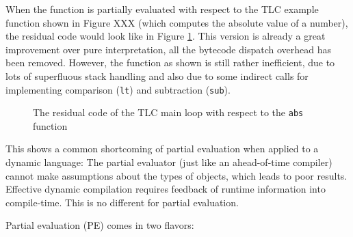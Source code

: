 When the function is partially evaluated with respect to the TLC example
function shown in Figure XXX (which computes the absolute value of a number),
the residual code would look like in Figure \ref{fig:tlc-folded}. This version
is already a great improvement over pure interpretation, all the bytecode
dispatch overhead has been removed. However, the function as shown is still
rather inefficient, due to lots of superfluous stack handling and also due to
some indirect calls for implementing comparison (\lstinline{lt}) and
subtraction (\lstinline{sub}).

\begin{figure}[h]
\label{fig:tlc-folded}
\begin{center}

\caption{The residual code of the TLC main loop with respect to the
\lstinline{abs} function }
\end{center}
\end{figure}

This shows a common shortcoming of partial evaluation when applied to a dynamic
language: The partial evaluator (just like an ahead-of-time compiler) cannot
make assumptions about the types of objects, which leads to poor results.
Effective dynamic compilation requires feedback of runtime information into
compile-time. This is no different for partial evaluation.

Partial evaluation (PE) comes in two flavors: 

